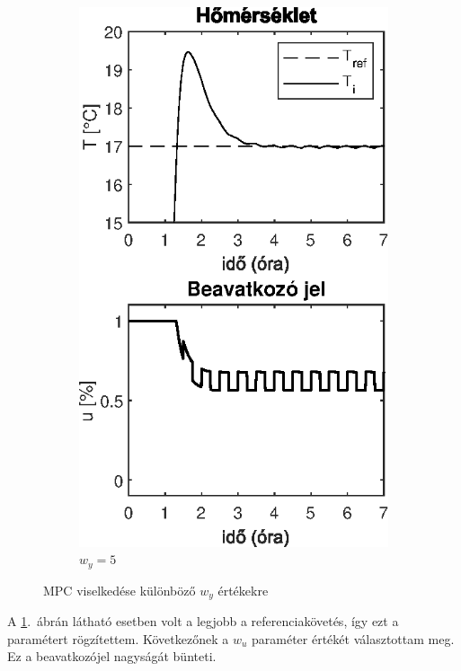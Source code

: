 \begin{figure}[H]
\begin{subfigure}[t]{0.32\textwidth}
		\includegraphics[width=\textwidth]{figures/realsys/mpc-wy-5}
		\caption{$w_y=5$}
		\label{fig:mpc-wy-5}
	\end{subfigure}
	\caption{MPC viselkedése különböző $w_y$ értékekre}
	\label{fig:mpc-wy}
\end{figure}

A \ref{fig:mpc-wy-5}.~ábrán látható esetben volt a legjobb a referenciakövetés, így ezt a paramétert rögzítettem. Következőnek a $w_u$ paraméter értékét választottam meg. Ez a beavatkozójel nagyságát bünteti.

